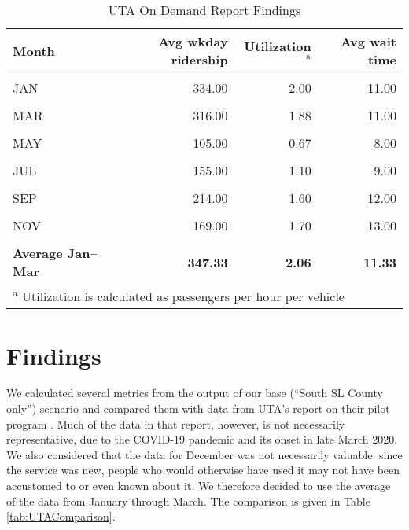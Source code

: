 \documentclass[3p, authoryear]{elsarticle} %
\begin{document}
\begin{table}[H]

\caption{\label{tab:UTAOD}UTA On Demand Report Findings}
\centering
\begin{tabular}[t]{lrrr}
\toprule
Month & Avg wkday ridership & Utilization$^{\text{a}}$ & Avg wait time\\
\midrule
\cellcolor{gray!6}{DEC} & \cellcolor{gray!6}{224.00} & \cellcolor{gray!6}{1.33} & \cellcolor{gray!6}{9.00}\\
JAN & 334.00 & 2.00 & 11.00\\
\cellcolor{gray!6}{FEB} & \cellcolor{gray!6}{392.00} & \cellcolor{gray!6}{2.31} & \cellcolor{gray!6}{12.00}\\
MAR & 316.00 & 1.88 & 11.00\\
\cellcolor{gray!6}{APR} & \cellcolor{gray!6}{275.00} & \cellcolor{gray!6}{1.52} & \cellcolor{gray!6}{10.00}\\
MAY & 105.00 & 0.67 & 8.00\\
\cellcolor{gray!6}{JUN} & \cellcolor{gray!6}{162.00} & \cellcolor{gray!6}{1.10} & \cellcolor{gray!6}{9.00}\\
JUL & 155.00 & 1.10 & 9.00\\
\cellcolor{gray!6}{AUG} & \cellcolor{gray!6}{193.00} & \cellcolor{gray!6}{1.50} & \cellcolor{gray!6}{12.00}\\
SEP & 214.00 & 1.60 & 12.00\\
\cellcolor{gray!6}{OCT} & \cellcolor{gray!6}{200.00} & \cellcolor{gray!6}{1.70} & \cellcolor{gray!6}{13.00}\\
NOV & 169.00 & 1.70 & 13.00\\
\textbf{\cellcolor{gray!6}{Average}} & \textbf{\cellcolor{gray!6}{228.25}} & \textbf{\cellcolor{gray!6}{1.53}} & \textbf{\cellcolor{gray!6}{10.75}}\\
\textbf{Average Jan--Mar} & \textbf{347.33} & \textbf{2.06} & \textbf{11.33}\\
\bottomrule
\multicolumn{4}{l}{\textsuperscript{a} Utilization is calculated as passengers per hour per vehicle}\\
\end{tabular}
\end{table}

\hypertarget{findings}{%
\section{Findings}\label{findings}}

We calculated several metrics from the output of our base (``South SL County only'') scenario and compared them with data from UTA's report on their pilot program \citep{UTAevalQ1, UTAevalQ2, UTAevalQ3, UTAevalQ4}. Much of the data in that report, however, is not necessarily representative, due to the COVID-19 pandemic and its onset in late March 2020. We also considered that the data for December was not necessarily valuable: since the service was new, people who would otherwise have used it may not have been accustomed to or even known about it. We therefore decided to use the average of the data from January through March. The comparison is given in Table \ref{tab:UTAComparison}.
\end{document}
